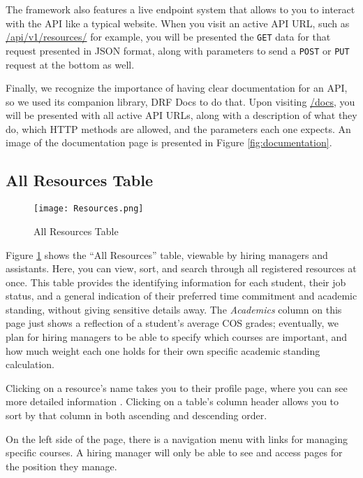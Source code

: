The framework also features a live endpoint system that allows to you to interact with the API like a typical website. When you visit an active API URL, such as \url{/api/v1/resources/} for example, you will be presented the \texttt{GET} data for that request presented in JSON format, along with parameters to send a \texttt{POST} or \texttt{PUT} request at the bottom as well.

Finally, we recognize the importance of having clear documentation for an API, so we used its companion library, DRF Docs \cite{drf-docs} to do that. Upon visiting \url{/docs}, you will be presented with all active API URLs, along with a description of what they do, which HTTP methods are allowed, and the parameters each one expects. An image of the documentation page is presented in Figure \ref{fig:documentation}.

\subsection{All Resources Table}

\begin{figure}[!htbp]
    \centering
    \texttt{[image: Resources.png]}
    \caption{All Resources Table}
    \label{fig:resources}
\end{figure}

Figure \ref{fig:resources} shows the ``All Resources'' table, viewable by hiring managers and assistants. Here, you can view, sort, and search through all registered resources at once. This table provides the identifying information for each student, their job status, and a general indication of their preferred time commitment and academic standing, without giving sensitive details away. The \textit{Academics} column on this page just shows a reflection of a student's average COS grades; eventually, we plan for hiring managers to be able to specify which courses are important, and how much weight each one holds for their own specific academic standing calculation.

Clicking on a resource's name takes you to their profile page, where you can see more detailed information . Clicking on a table's column header allows you to sort by that column in both ascending and descending order.

\newpage
On the left side of the page, there is a navigation menu with links for managing specific courses. A hiring manager will only be able to see and access pages for the position they manage.

